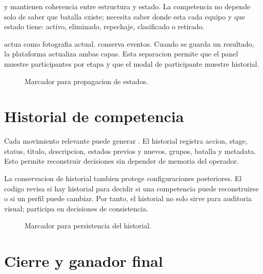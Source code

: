  y  mantienen coherencia entre estructura y estado. La competencia no depende solo de saber que batalla existe; necesita saber donde esta cada equipo y que estado tiene: activo, eliminado, repechaje, clasificado o retirado.

 actua como fotografia actual.  conserva eventos. Cuando se guarda un resultado, la plataforma actualiza ambas capas. Esta separacion permite que el panel muestre participantes por etapa y que el modal de participante muestre historial.

\begin{figure}[H]
  \centering
  \caption{Marcador para propagacion de estados.}
  \label{fig:flujo-propagacion-estados}
\end{figure}

\section{Historial de competencia}
\label{sec:flujo-historial}

Cada movimiento relevante puede generar . El historial registra accion, stage, status, titulo, descripcion, estados previos y nuevos, grupos, batalla y metadata. Esto permite reconstruir decisiones sin depender de memoria del operador.

La conservacion de historial tambien protege configuraciones posteriores. El codigo revisa si hay historial para decidir si una competencia puede reconstruirse o si un perfil puede cambiar. Por tanto, el historial no solo sirve para auditoria visual; participa en decisiones de consistencia.

\begin{figure}[H]
  \centering
  \caption{Marcador para persistencia del historial.}
  \label{fig:flujo-persistencia-historial}
\end{figure}

\section{Cierre y ganador final}
\label{sec:flujo-cierre}

